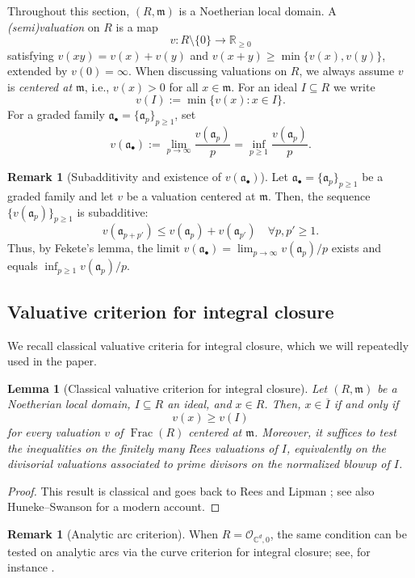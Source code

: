 \documentclass[12pt]{amsart}
\newcommand{\RR}{\mathbb{R}}
\newcommand{\CC}{\mathbb{C}}
\newcommand{\m}{\mathfrak m}
\renewcommand{\a}{\mathfrak{a}}
\DeclareMathOperator{\Frac}{Frac}
\newcommand{\abul}{{\a_\bullet}}
\theoremstyle{plain}
\newtheorem{lemma}[theorem]{Lemma}
\theoremstyle{definition}
\newtheorem{remark}[theorem]{Remark}
\numberwithin{equation}{section}
\begin{document}
Throughout this section, $(R,\m)$ is a Noetherian local domain.
A \emph{(semi)valuation} on $R$ is a map
\[
v:R\setminus\{0\}\to \RR_{\ge0}
\]
satisfying $v(xy)=v(x)+v(y)$ and $v(x+y)\ge \min\{v(x),v(y)\}$, extended by $v(0)=\infty$.
When discussing valuations on $R$, we always assume $v$ is \emph{centered at $\m$}, i.e.,  $v(x)>0$ for all $x\in\m$.
For an ideal $I\subseteq R$ we write
\[
v(I):=\min\{v(x):x\in I\}.
\]
For a graded family $\abul=\{\a_p\}_{p\ge1}$, set
\[
v(\abul):=\lim_{p\to\infty}\frac{v(\a_p)}{p}
=\inf_{p\ge1}\frac{v(\a_p)}{p}.
\]

\begin{remark}[Subadditivity and existence of $v(\abul)$]\label{lem:vabul-exists}
	Let $\abul=\{\a_p\}_{p \ge 1}$ be a graded family and let $v$ be a valuation centered at $\m$.
	Then, the sequence $\{v(\a_p)\}_{p \ge 1}$ is subadditive:
	\[
	v(\a_{p+p'})\le v(\a_p)+v(\a_{p'}) \quad \forall p,p'\ge1.
	\]
	Thus, by Fekete's lemma, the limit $v(\abul)=\lim_{p\to\infty} v(\a_p)/p$ exists and equals
	$\inf_{p\ge1} v(\a_p)/p$.
\end{remark}

\subsection{Valuative criterion for integral closure}
We recall classical valuative criteria for integral closure, which we will repeatedly used in the paper.

\begin{lemma}[Classical valuative criterion for integral closure]\label{thm:valuative-ic}
  Let $(R,\m)$ be a Noetherian local domain, $I\subseteq R$ an ideal, and $x\in R$.
  Then, $x\in \overline{I}$ if and only if
  \[
    v(x)\ge v(I)
  \]
  for every valuation $v$ of $\Frac(R)$ centered at $\m$. Moreover, it suffices to test the inequalities on the finitely many Rees valuations of $I$, equivalently on the divisorial valuations associated to prime divisors on the normalized blowup of $I$.
\end{lemma}


\begin{proof} This result is classical and goes back to Rees \cite{Rees} and Lipman \cite{Lipman}; see also Huneke--Swanson \cite[Chapters 6 and 10]{HS} for a modern account. 
\end{proof}

\begin{remark}[Analytic arc criterion]\label{rem:arc-criterion}
	When $R=\mathcal O_{\CC^d,0}$, the same condition can be tested on analytic arcs
	via the curve criterion for integral closure; see, for instance \cite{LT}. 
\end{remark}
\end{document}
